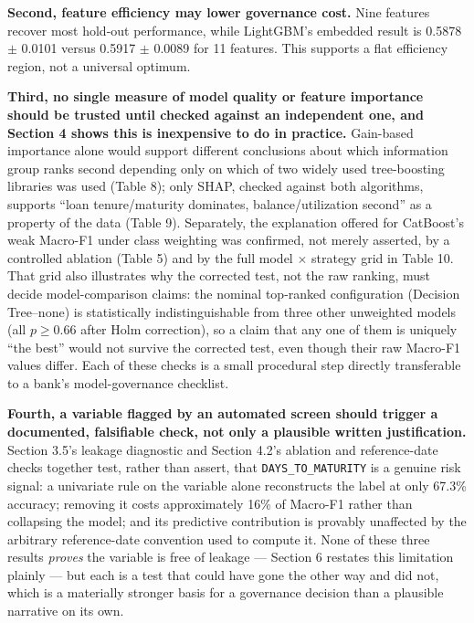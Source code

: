 \documentclass[11pt,a4paper]{article}
\begin{document}
\textbf{Second, feature efficiency may lower governance cost.} Nine features recover most hold-out performance, while LightGBM's embedded result is 0.5878 $\pm$ 0.0101 versus 0.5917 $\pm$ 0.0089 for 11 features. This supports a flat efficiency region, not a universal optimum.

\textbf{Third, no single measure of model quality or feature importance should be trusted until checked against an independent one, and Section 4 shows this is inexpensive to do in practice.} Gain-based importance alone would support different conclusions about which information group ranks second depending only on which of two widely used tree-boosting libraries was used (Table 8); only SHAP, checked against both algorithms, supports ``loan tenure/maturity dominates, balance/utilization second'' as a property of the data (Table 9). Separately, the explanation offered for CatBoost's weak Macro-F1 under class weighting was confirmed, not merely asserted, by a controlled ablation (Table 5) and by the full model $\times$ strategy grid in Table 10. That grid also illustrates why the corrected test, not the raw ranking, must decide model-comparison claims: the nominal top-ranked configuration (Decision Tree--none) is statistically indistinguishable from three other unweighted models (all $p \geq 0.66$ after Holm correction), so a claim that any one of them is uniquely ``the best'' would not survive the corrected test, even though their raw Macro-F1 values differ. Each of these checks is a small procedural step directly transferable to a bank's model-governance checklist.

\textbf{Fourth, a variable flagged by an automated screen should trigger a documented, falsifiable check, not only a plausible written justification.} Section 3.5's leakage diagnostic and Section 4.2's ablation and reference-date checks together test, rather than assert, that \texttt{DAYS\_TO\_MATURITY} is a genuine risk signal: a univariate rule on the variable alone reconstructs the label at only 67.3\% accuracy; removing it costs approximately 16\% of Macro-F1 rather than collapsing the model; and its predictive contribution is provably unaffected by the arbitrary reference-date convention used to compute it. None of these three results \textit{proves} the variable is free of leakage --- Section 6 restates this limitation plainly --- but each is a test that could have gone the other way and did not, which is a materially stronger basis for a governance decision than a plausible narrative on its own.
\end{document}
